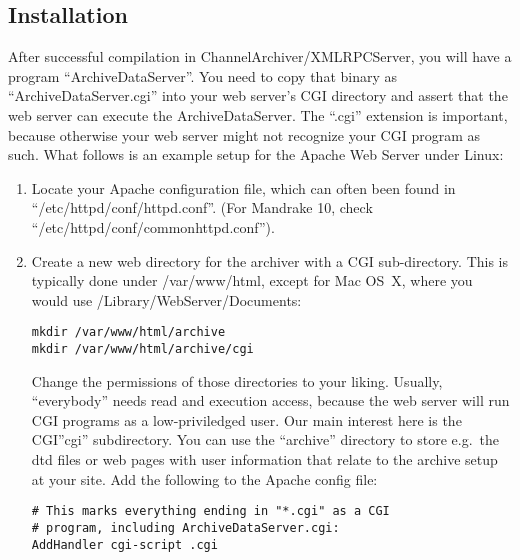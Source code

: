 \subsection{Installation} %
After successful compilation in ChannelArchiver/XMLRPCServer, you will
have a program ``ArchiveDataServer''. You need to copy that binary as
``ArchiveDataServer.cgi'' into your web server's CGI directory and
assert that the web server can execute the ArchiveDataServer.
The ``.cgi'' extension is important, because otherwise your web server
might not recognize your CGI program as such.
What follows is an example setup for the Apache Web Server under Linux:
\begin{enumerate}
\item Locate your Apache configuration file, which can often been
  found in ``/etc/httpd/conf/httpd.conf''. (For Mandrake 10, check
  ``/etc/httpd/conf/commonhttpd.conf'').
\item Create a new web directory for the archiver with a CGI
   sub-directory. This is typically done under /var/www/html,
   except for Mac OS~X, where you would use /Library/WebServer/Documents:
\begin{lstlisting}[keywordstyle=\sffamily]
mkdir /var/www/html/archive
mkdir /var/www/html/archive/cgi
\end{lstlisting}
   Change the permissions of those directories to your liking.
   Usually, ``everybody'' needs read and execution access, because
   the web server will run CGI programs as a low-priviledged user. 
   Our main interest here is the CGI''cgi'' subdirectory.
   You can use the ``archive'' directory to store e.g.\ the dtd files
   or web pages with user information that relate to the archive setup
   at your site.
   Add the following to the Apache config file:
\begin{lstlisting}[keywordstyle=\sffamily]
# This marks everything ending in "*.cgi" as a CGI
# program, including ArchiveDataServer.cgi:
AddHandler cgi-script .cgi


\end{lstlisting}
\end{enumerate}
